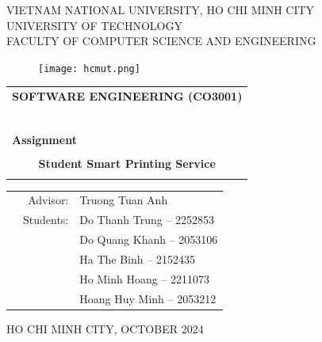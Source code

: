 \documentclass[a4paper]{report}
\begin{document}
\begin{titlepage}
\begin{center}
VIETNAM NATIONAL UNIVERSITY, HO CHI MINH CITY \\
UNIVERSITY OF TECHNOLOGY \\
FACULTY OF COMPUTER SCIENCE AND ENGINEERING
\end{center}

\vspace{3cm}

\begin{figure}[h!]
\begin{center}
\texttt{[image: hcmut.png]}
\end{center}
\end{figure}

\vspace{1cm}


\begin{center}
\begin{tabular}{c}
\multicolumn{1}{l}{\textbf{{\Large SOFTWARE ENGINEERING (CO3001)}}}\\
~~\\
\hline
\\
\multicolumn{1}{l}{\textbf{{\Large Assignment}}}\\
\\
\textbf{{\Huge Student Smart Printing Service}}\\
\\
\hline
\end{tabular}
\end{center}

\vspace{3cm}

\begin{table}[h]
\begin{tabular}{rrl}
\hspace{5 cm} & Advisor: & Truong Tuan Anh\\

& Students: & Do Thanh Trung – 2252853\\
& & Do Quang Khanh – 2053106 \\
& & Ha The Binh – 2152435\\
& & Ho Minh Hoang – 2211073 \\
& & Hoang Huy Minh – 2053212
\end{tabular}
\end{table}


    \vspace*{5cm} %
    \begin{center}
        {\footnotesize HO CHI MINH CITY, OCTOBER 2024}
    \end{center}
\end{titlepage}
\end{document}

